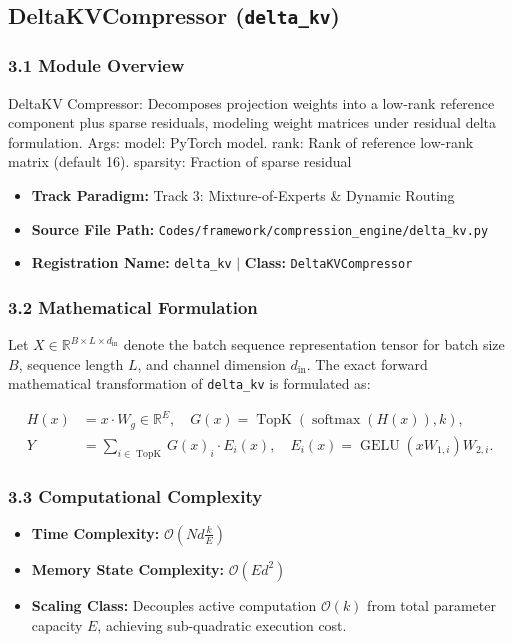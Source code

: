 \subsection{DeltaKVCompressor (\texttt{delta\_kv})}
\label{sec:app_module_delta\_kv}

\subsubsection*{3.1 Module Overview}
DeltaKV Compressor: Decomposes projection weights into a low-rank reference component plus sparse residuals, modeling weight matrices under residual delta formulation.  Args:     model: PyTorch model.     rank: Rank of reference low-rank matrix (default 16).     sparsity: Fraction of sparse residual
\begin{itemize}
    \item \textbf{Track Paradigm:} Track 3: Mixture-of-Experts & Dynamic Routing
    \item \textbf{Source File Path:} \texttt{Codes/framework/compression\_engine/delta\_kv.py}
    \item \textbf{Registration Name:} \texttt{delta\_kv} $\mid$ \textbf{Class:} \texttt{DeltaKVCompressor}
\end{itemize}

\subsubsection*{3.2 Mathematical Formulation}
Let $X \in \mathbb{R}^{B \times L \times d_{\text{in}}}$ denote the batch sequence representation tensor for batch size $B$, sequence length $L$, and channel dimension $d_{\text{in}}$. The exact forward mathematical transformation of \texttt{delta\_kv} is formulated as:

\begin{align}
H(x) &= x \cdot W_g \in \mathbb{R}^{E}, \quad G(x) = \operatorname{TopK}\left(\operatorname{softmax}(H(x)), k\right), \\
Y &= \sum_{i \in \operatorname{TopK}} G(x)_i \cdot E_i(x), \quad E_i(x) = \operatorname{GELU}(x W_{1, i}) W_{2, i}.
\end{align}


\subsubsection*{3.3 Computational Complexity}
\begin{itemize}
    \item \textbf{Time Complexity:} $\mathcal{O}(N d \frac{k}{E})$
    \item \textbf{Memory State Complexity:} $\mathcal{O}(E d^2)$
    \item \textbf{Scaling Class:} Decouples active computation $\mathcal{O}(k)$ from total parameter capacity $E$, achieving sub-quadratic execution cost.
\end{itemize}

